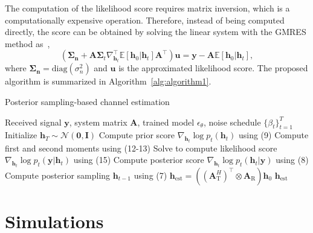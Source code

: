 \documentclass[lettersize,journal]{IEEEtran}
\begin{document}
The computation of the likelihood score requires matrix inversion, which is a computationally expensive operation. Therefore, instead of being computed directly, the score can be obtained by solving the linear system with the GMRES method as~\cite{saadGMRESGeneralizedMinimal1986},
\begin{equation}
(\boldsymbol{\Sigma}_{\mathbf{n}}+\mathbf{A}\boldsymbol{\Sigma}_{t}\nabla_{\mathbf{h}_{t}}^{\top}\mathbb{E}[\mathbf{h}_{0}|\mathbf{h}_{t}]\mathbf{A}^{\top})\mathbf{u} = \mathbf{y}- \mathbf{A}\mathbb{E}[\mathbf{h}_{0}|\mathbf{h}_{t}],
\end{equation}
where $\boldsymbol{\Sigma}_{\mathbf{n}} = \text{diag}(\sigma_{n}^{2})$ and $\mathbf{u}$ is the approximated likelihood score. The proposed algorithm is summarized in Algorithm~\ref{alg:algorithm1}.

\begin{algorithm}[!t]
\caption{Posterior sampling-based channel estimation}
\label{alg:algorithm1}
\begin{algorithmic}[1]
\REQUIRE Received signal $\mathbf{y}$, system matrix $\mathbf{A}$, trained model $\epsilon_{\theta}$, noise schedule $\{\beta_{t}\}_{t=1}^{T}$
\STATE Initialize $\mathbf{h}_T \sim \mathcal{N}(\mathbf{0}, \mathbf{I})$
	\STATE Compute prior score $\nabla_{\mathbf{h}_{t}}\log p_{t}(\mathbf{h}_{t})$ using (9)
	\STATE Compute first and second moments using (12-13)
	\STATE Solve to compute likelihood score $\nabla_{\mathbf{h}_{t}}\log p_{t}(\mathbf{y}|\mathbf{h}_{t})$ using (15)
	\STATE Compute posterior score $\nabla_{\mathbf{h}_{t}}\log p_{t}(\mathbf{h}_{t}|\mathbf{y})$ using (8)
	\STATE Compute posterior sampling $\mathbf{h}_{t-1}$ using (7)
\ENDFOR
\STATE $\mathbf{h}_{\text{est}} = ((\mathbf{A}_{\text{T}}^{H})^{\top}\otimes \mathbf{A}_{\text{R}})\mathbf{h}_{0}$
\RETURN $\mathbf{h}_{\text{est}}$
\end{algorithmic}
\end{algorithm}

\section{Simulations}
\end{document}
